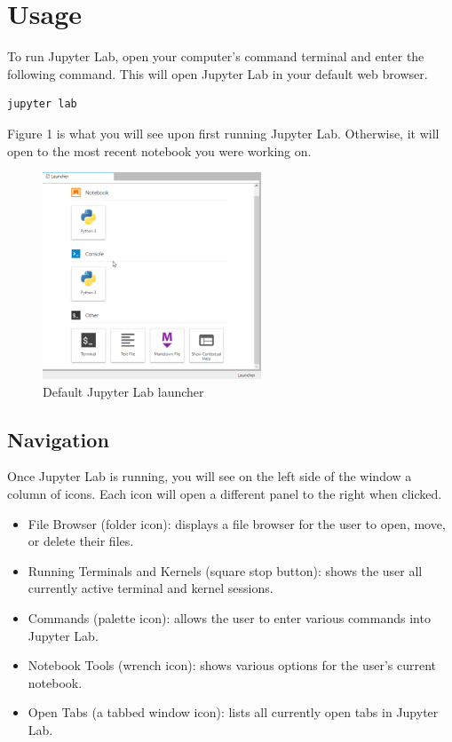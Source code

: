 \documentclass[pdftex,12pt]{artikel3}
\begin{document}
\section{Usage}

To run Jupyter Lab, open your computer's command terminal and enter the following command. This will open Jupyter Lab in your default web browser.

\begin{lstlisting}
jupyter lab
\end{lstlisting}

Figure 1 is what you will see upon first running Jupyter Lab. Otherwise, it will open to the most recent notebook you were working on.

\begin{figure}[h!]
    \centering
    \includegraphics[width=65mm]{launcher.png}
    \caption{Default Jupyter Lab launcher}
    \label{fig:jupyterlablauncher}
\end{figure}

\subsection{Navigation}

Once Jupyter Lab is running, you will see on the left side of the window a column of icons. 
Each icon will open a different panel to the right when clicked. 

\begin{itemize}
    \item File Browser (folder icon): displays a file browser for the user to open, move, or delete their files.
    \item Running Terminals and Kernels (square stop button): shows the user all currently active terminal and kernel sessions.
    \item Commands (palette icon): allows the user to enter various commands into Jupyter Lab.
    \item Notebook Tools (wrench icon): shows various options for the user's current notebook.
    \item Open Tabs (a tabbed window icon): lists all currently open tabs in Jupyter Lab.
\end{itemize}
\end{document}
